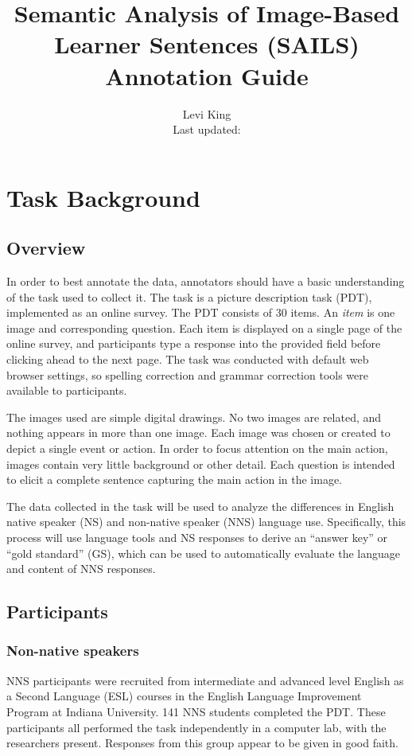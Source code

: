 \documentclass[12pt,notitlepage]{article}
\title{\large{Semantic Analysis of Image-Based Learner Sentences (SAILS)} \\ Annotation Guide}
\author{Levi King \\ Last updated: \vspace{-1em}}
\begin{document}
\maketitle
\tableofcontents

\section{Task Background} \label{sec:background}

\subsection{Overview}
In order to best annotate the data, annotators should have a basic understanding of the task used to collect it. The task is a picture description task (PDT), implemented as an online survey. The PDT consists of 30 items. An \textit{item} is one image and corresponding question. Each item is displayed on a single page of the online survey, and participants type a response into the provided field before clicking ahead to the next page. The task was conducted with default web browser settings, so spelling correction and grammar correction tools were available to participants.

The images used are simple digital drawings. No two images are related, and nothing appears in more than one image. Each image was chosen or created to depict a single event or action. In order to focus attention on the main action, images contain very little background or other detail. Each question is intended to elicit a complete sentence capturing the main action in the image. 

The data collected in the task will be used to analyze the differences in English native speaker (NS) and non-native speaker (NNS) language use. Specifically, this process will use language tools and NS responses to derive an ``answer key'' or ``gold standard'' (GS), which can be used to automatically evaluate the language and content of NNS responses.

\subsection{Participants}
\subsubsection{Non-native speakers}
NNS participants were recruited from intermediate and advanced level English as a Second Language (ESL) courses in the English Language Improvement Program at Indiana University. 141 NNS students completed the PDT. These participants all performed the task independently in a computer lab, with the researchers present. Responses from this group appear to be given in good faith.
\end{document}
